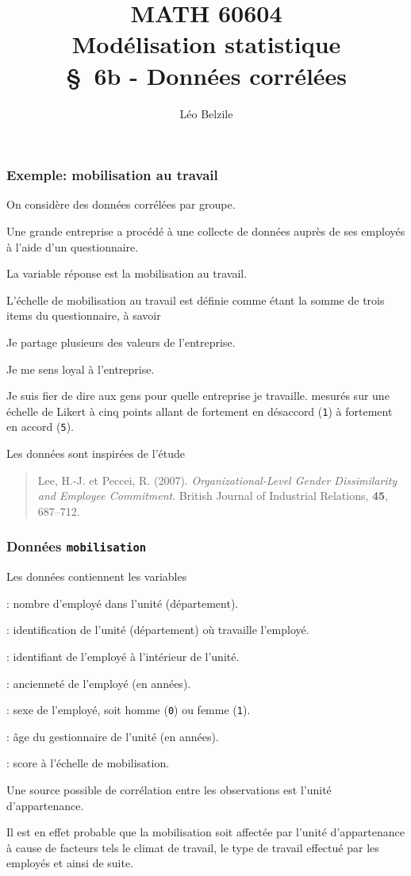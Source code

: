 \documentclass{beamer}
\title[\color{white}{MATH 60604 \S~6b - Données corrélées}]{\texorpdfstring{MATH 60604 \\Modélisation statistique \\ \S~6b - Données corrélées}{MATH 60604 \\Modélisation statistique \\ \S~6b - Données corrélées}}
\author{Léo Belzile}
\institute{HEC Montréal\\
Département de sciences de la décision}
\date{}
\begin{document}
\frame{\titlepage}

%

\begin{frame}[fragile]
\frametitle{Exemple: mobilisation au travail}
 On considère des données corrélées par groupe.

\bi
\item  Une grande entreprise a procédé à une collecte de données auprès de ses
employés à l'aide d'un questionnaire.
\item La variable réponse est la \alert{mobilisation au travail}.
\item L'échelle de mobilisation au travail est
définie comme étant la somme de trois items du questionnaire, à savoir
\bi
\vp
\item Je partage plusieurs des valeurs de l'entreprise.
\item Je me sens loyal à l'entreprise.
\item Je suis fier de dire aux gens pour quelle entreprise je travaille.
\ei
mesurés sur une échelle de
Likert à cinq points allant de fortement en désaccord (\texttt{1}) à fortement en accord (\texttt{5}).
\item Les données sont inspirées de l'étude
\begin{quote}
Lee, H.-J. et Peccei, R. (2007). \textsl{Organizational-Level Gender Dissimilarity and
Employee Commitment}. British Journal of Industrial Relations, \textbf{45}, 687--712.
\end{quote}
\ei
\end{frame}

\begin{frame}[fragile]
\frametitle{Données \texttt{mobilisation}}
\bi
\item  Les données  contiennent les variables
\bi
\vp
\item {}: nombre d'employé dans l'unité (département).
\item {}: identification de l'unité (département) où travaille l'employé.
\item  {}: identifiant de l'employé à l'intérieur de l'unité.
\item {}: ancienneté de l'employé (en années).
\item {}: sexe de l'employé, soit homme (\texttt{0}) ou femme (\texttt{1}).
\item  {}: âge du gestionnaire de l'unité (en années).
\item {}: score à l'échelle de mobilisation.
\ei
\item Une \alert{source possible de corrélation} entre les observations est \alert{l'unité d'appartenance}.
\item Il est en effet probable que la mobilisation soit affectée par l'unité d'appartenance à cause de facteurs tels le climat de travail, le type de travail effectué par les employés et ainsi de suite.
\ei
\end{frame}
\end{document}
